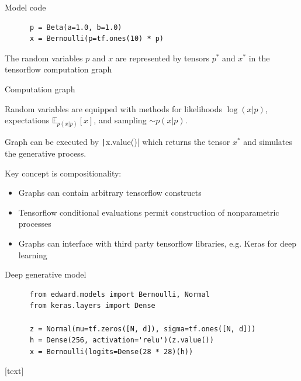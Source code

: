 \documentclass[10pt]{beamer}
\begin{document}
\begin{frame}[fragile]
\inputminted{python}{beta-bernoulli.py}
\end{frame}

\begin{frame}[fragile]
  \begin{block}{Model code}
    \begin{verbatim}
      p = Beta(a=1.0, b=1.0)
      x = Bernoulli(p=tf.ones(10) * p)
    \end{verbatim}
  \end{block}
  The random variables $p$ and $x$ are represented by tensors $p^*$ and $x^*$ in the tensorflow computation graph
  \begin{block}{Computation graph}
    \begin{center}
      
    \end{center}
  \end{block}
  Random variables are equipped with methods for likelihoods $\log(x|p)$,
  expectations $\mathbb{E}_{p(x|p)}[x]$, and sampling $\sim p(x|p)$.

  Graph can be executed by \texttt|x.value()| which returns the tensor $x^*$ and simulates the
  generative process.
\end{frame}

\begin{frame}[fragile]
  Key concept is compositionality:
  \begin{itemize}
    \item Graphs can contain arbitrary tensorflow constructs
    \item Tensorflow conditional evaluations permit construction of nonparametric processes
    \item Graphs can interface with third party tensorflow libraries, e.g. Keras for
      deep learning
  \end{itemize}
  \begin{block}{Deep generative model}
    \begin{verbatim}
      from edward.models import Bernoulli, Normal
      from keras.layers import Dense

      z = Normal(mu=tf.zeros([N, d]), sigma=tf.ones([N, d]))
      h = Dense(256, activation='relu')(z.value())
      x = Bernoulli(logits=Dense(28 * 28)(h))
    \end{verbatim}
  \end{block}
\end{frame}

\begin{frame}[allowframebreaks]%
[text]

\renewcommand*{\bibfont}{\small}
\printbibliography
\end{frame}
\end{document}

